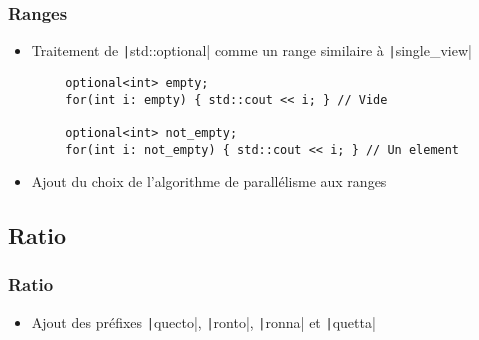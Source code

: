 \documentclass[C++.tex]{subfiles}
\begin{document}
\begin{frame}[fragile]
	\frametitle{Ranges}
	\begin{itemize}
		\item Traitement de \texttt|std::optional| comme un range similaire à \texttt|single_view|
	\end{itemize}

	\begin{verbatim}
		optional<int> empty;
		for(int i: empty) { std::cout << i; } // Vide

		optional<int> not_empty;
		for(int i: not_empty) { std::cout << i; } // Un element
	\end{verbatim}

	\begin{itemize}
		\item Ajout du choix de l'algorithme de parallélisme aux ranges
	\end{itemize}

\end{frame}

\subsection*{Ratio}
\begin{frame}[fragile]
	\frametitle{Ratio}
	\begin{itemize}
		\item Ajout des préfixes \texttt|quecto|, \texttt|ronto|, \texttt|ronna| et \texttt|quetta|
	\end{itemize}

\end{frame}
\end{document}
